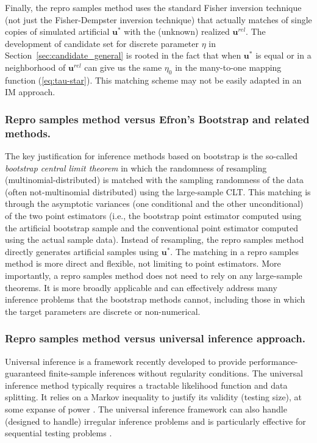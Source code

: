 \documentclass[12pt]{article}
\theoremstyle{shortspace}
\def\*#1{\bm{#1}}
\begin{document}
Finally, the repro samples method uses the standard Fisher inversion technique (not just the Fisher-Dempster inversion technique) that actually matches of single copies of simulated artificial $\*u^*$ with the (unknown) realized $\*u^{rel}$. The development of candidate set for discrete parameter $\eta$ in Section~\ref{sec:candidate_general} is rooted in the fact that when $\*u^*$ is equal or in a neighborhood of $\*u^{rel}$ can give us the same $\eta_0$ in the many-to-one mapping function (\ref{eq:tau-star}). This matching scheme may not be easily adapted in an IM approach. 



\subsubsection{ Repro samples method versus Efron's Bootstrap and related methods.} 
 The key justification for inference methods based on bootstrap is the so-called {\it bootstrap central limit theorem}
\citep{Singh1981, Bickel1981} 
 in which the randomness of resampling (multinomial-distributed) is matched with the sampling randomness of the 
 data (often not-multinomial distributed) using the large-sample 
CLT. This matching is through the asymptotic variances (one conditional and the other unconditional) of the two point estimators (i.e., the bootstrap point estimator computed using  the artificial bootstrap sample and the conventional point estimator computed using  the actual sample data). Instead of resampling, the repro samples method directly generates artificial samples using $\*u^*$. The matching in a repro samples method is  more direct and flexible, not limiting to point estimators. More importantly, a repro samples method does not need to rely on any large-sample theorems. It is more broadly applicable and can effectively address many inference problems 
 that the bootstrap methods cannot, 
 including those in which the target parameters are discrete or non-numerical.  

\subsubsection{ Repro samples method versus universal inference approach.} Universal inference \citep{wasserman2020universal} is a  framework recently developed to provide performance-guaranteed  finite-sample 
    inferences
without regularity conditions. 
The universal inference method typically requires a tractable likelihood function and data splitting. It relies on a Markov inequality to justify its validity (testing size), at some expanse of power \citep{Dunn2022, TseDavison2023, xie2023discussion}. 
The universal inference framework can also handle (designed to handle)  irregular inference problems and is particularly effective for sequential testing problems \citep{ramdas2020admissible,xie2023discussion}. 
\end{document}
